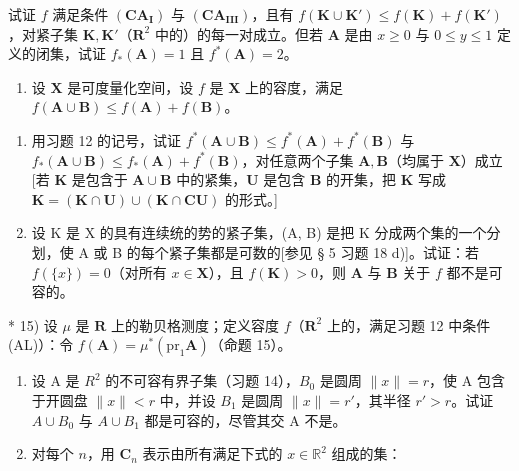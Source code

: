 试证 \(f\) 满足条件 \((\mathbf{CA}_{\mathbf{I}})\) 与 \((\mathbf{CA}_{\mathbf{III}})\)，且有 \(f(\mathbf{K} \cup \mathbf{K}') \leqslant f(\mathbf{K}) + f(\mathbf{K}')\)，对紧子集 \(\mathbf{K}, \mathbf{K}'\)（\(\mathbf{R}^2\) 中的）的每一对成立。但若 \(\mathbf{A}\) 是由 \(x \geqslant 0\) 与 \(0 \leqslant y \leqslant 1\) 定义的闭集，试证 \(f_*(\mathbf{A}) = 1\) 且 \(f^*(\mathbf{A}) = 2\)。

\begin{enumerate}
\def\labelenumi{\arabic{enumi})}
\setcounter{enumi}{13}
\tightlist
\item
  设 \(\mathbf{X}\) 是可度量化空间，设 \(f\) 是 \(\mathbf{X}\) 上的容度，满足 \(f(\mathbf{A} \cup \mathbf{B}) \leqslant f(\mathbf{A}) + f(\mathbf{B})\)。
\end{enumerate}

\begin{enumerate}
\def\labelenumi{\alph{enumi})}
\item
  用习题 12 的记号，试证 \(f^{*}(\mathbf{A} \cup \mathbf{B}) \leqslant f^{*}(\mathbf{A}) + f^{*}(\mathbf{B})\) 与 \(f_{*}(\mathbf{A} \cup \mathbf{B}) \leqslant f_{*}(\mathbf{A}) + f^{*}(\mathbf{B})\)，对任意两个子集 \(\mathbf{A}, \mathbf{B}\)（均属于 \(\mathbf{X}\)）成立{[}若 \(\mathbf{K}\) 是包含于 \(\mathbf{A} \cup \mathbf{B}\) 中的紧集，\(\mathbf{U}\) 是包含 \(\mathbf{B}\) 的开集，把 \(\mathbf{K}\) 写成 \(\mathbf{K} = (\mathbf{K} \cap \mathbf{U}) \cup (\mathbf{K} \cap \mathbf{C}\mathbf{U})\) 的形式。{]}
\item
  设 K 是 X 的具有连续统的势的紧子集，(A, B) 是把 K 分成两个集的一个分划，使 A 或 B 的每个紧子集都是可数的{[}参见 § 5 习题 18 d){]}。试证：若 \(f(\{x\}) = 0\)（对所有 \(x \in \mathbf{X}\)），且 \(f(\mathbf{K}) > 0\)，则 \(\mathbf{A}\) 与 \(\mathbf{B}\) 关于 \(f\) 都不是可容的。
\end{enumerate}

* 15) 设 \(\mu\) 是 \(\mathbf{R}\) 上的勒贝格测度；定义容度 \(f\)（\(\mathbf{R}^2\) 上的，满足习题 12 中条件 (AL)）：令 \(f(\mathbf{A}) = \mu^{*}(\mathrm{pr}_{1}\mathbf{A})\)（命题 15）。

\begin{enumerate}
\def\labelenumi{\alph{enumi})}
\item
  设 A 是 \(R^{2}\) 的不可容有界子集（习题 14），\(B_{0}\) 是圆周 \(\|x\| = r\)，使 A 包含于开圆盘 \(\|x\| < r\) 中，并设 \(B_{1}\) 是圆周 \(\|x\| = r'\)，其半径 \(r' > r\)。试证 \(A \cup B_{0}\) 与 \(A \cup B_{1}\) 都是可容的，尽管其交 A 不是。
\item
  对每个 \(n\)，用 \(\mathbf{C}_n\) 表示由所有满足下式的 \(x \in \mathbb{R}^2\) 组成的集：
\end{enumerate}

